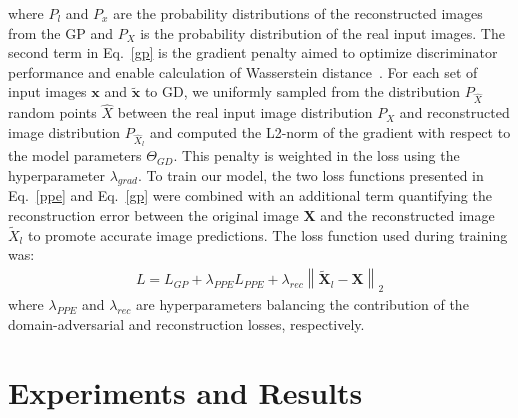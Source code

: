 \documentclass[conference]{IEEEtran}
\begin{document}
where $P_l$ and $P_x$ are the probability distributions of the reconstructed images from the GP and $P_X$ is the probability distribution of the real input images. The second term in Eq.~\ref{gp} is the gradient penalty aimed to optimize discriminator performance and enable calculation of Wasserstein distance~\cite{Gulrajani2017Improved}. For each set of input images $\textbf{x}$ and $\tilde{\textbf{x}}$ to GD, we uniformly sampled from the distribution $P_{\hat{X}}$ random points $\hat{X}$ between the real input image distribution $P_X$ and reconstructed image distribution $P_{\hat{X}_l}$ and computed the L2-norm of the gradient with respect to the model parameters $\Theta_{GD}$. This penalty is weighted in the loss using the hyperparameter $\lambda _{grad}$.
To train our model, the two loss functions presented in Eq.~\ref{ppe} and Eq.~\ref{gp} were combined with an additional term quantifying the reconstruction error between the original image $\textbf{X}$ and the reconstructed image $\tilde{X}_l$ to promote accurate image predictions. The loss function used during training was:
\begin{multline}\label{loss}
    L = L_{GP} + \lambda_{PPE}L_{PPE}+\lambda_{rec}\left\lVert \tilde{\textbf{X}}_l-\textbf{X}\right\rVert_2
\end{multline}
\vspace*{-1mm}
where $\lambda_{PPE}$ and $\lambda_{rec}$ are hyperparameters balancing the contribution of the domain-adversarial and reconstruction losses, respectively. 
\section{Experiments and Results}
\end{document}

